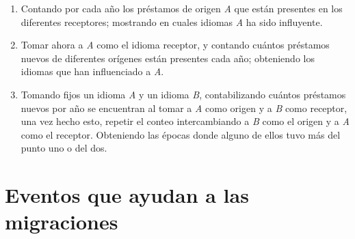 \begin{enumerate}
	\label{proceso.nuevos}
	
\item Contando por cada año los préstamos de origen \textit{A} que están presentes en los diferentes receptores; mostrando en cuales idiomas \textit{A} ha sido influyente.

\item Tomar ahora a \textit{A}  como el idioma receptor, y contando cuántos préstamos nuevos de diferentes orígenes están presentes cada año; obteniendo los idiomas que han influenciado a \textit{A}. 


\item Tomando fijos un idioma \textit{A} y un idioma \textit{B}, contabilizando cuántos préstamos nuevos por año se encuentran al tomar a  \textit{A} como origen y a \textit{B} como receptor,  una vez hecho esto,  repetir el conteo intercambiando a \textit{B} como el origen y a \textit{A} como el receptor. Obteniendo las épocas donde alguno de ellos tuvo más del punto uno o del dos. 

\end{enumerate}



\section{Eventos que ayudan a las migraciones} %


